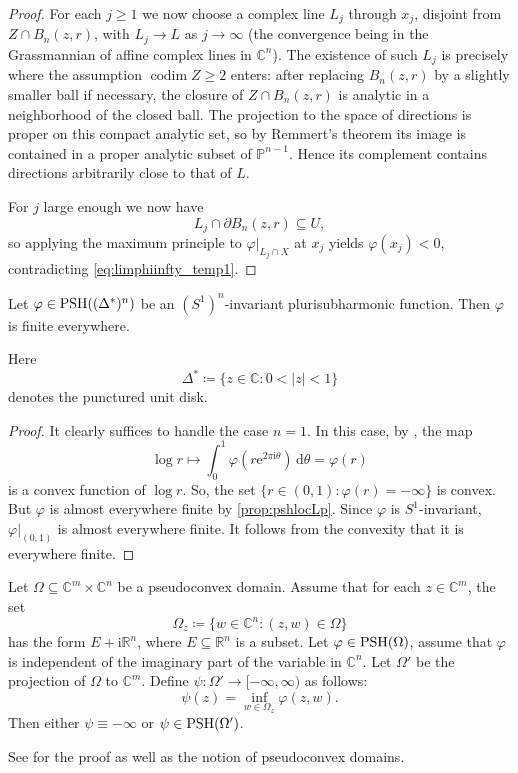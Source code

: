 \begin{proof}
    For each $j\geq 1$ we now choose a complex line $L_j$ through $x_j$, disjoint from $Z\cap B_n(z,r)$, with $L_j\to L$ as $j\to\infty$ (the convergence being in the Grassmannian of affine complex lines in $\mathbb{C}^n$). The existence of such $L_j$ is precisely where the assumption $\operatorname{codim} Z\geq 2$ enters: after replacing $B_n(z,r)$ by a slightly smaller ball if necessary, the closure of $Z\cap B_n(z,r)$ is analytic in a neighborhood of the closed ball. The projection to the space of directions is proper on this compact analytic set, so by Remmert's theorem its image is contained in a proper analytic subset of $\mathbb{P}^{n-1}$. Hence its complement contains directions arbitrarily close to that of $L$.

    For $j$ large enough we now have
    \[
        L_j\cap \partial B_n(z,r)\subseteq U,
    \]
    so applying the maximum principle to $\varphi|_{L_j\cap X}$ at $x_j$ yields $\varphi(x_j)<0$, contradicting \eqref{eq:limphiinfty_temp1}.
\end{proof}



\begin{lemma}\label{lma:invariantpshfunfinite}
    Let $\varphi\in \mathrm{PSH}((\Delta^*)^n)$ be an $(S^1)^n$-invariant plurisubharmonic function. Then $\varphi$ is finite everywhere.
\end{lemma}
Here
\[
\Delta^*\coloneqq \{z\in \mathbb{C}: 0<|z|<1\}
\]
denotes the punctured unit disk.
\begin{proof}
    It clearly suffices to handle the case $n=1$. In this case, by \cite[Theorem~2.12]{HK76}, the map
    \[
    \log r\mapsto \int_{0}^{1} \varphi\left(r\mathrm{e}^{2\pi\mathrm{i}\theta}\right)\,\mathrm{d}\theta=\varphi(r)
    \]
    is a convex function of $\log r$.
    So, the set $\{r\in (0,1): \varphi(r)=-\infty\}$ is convex.
    But $\varphi$ is almost everywhere finite by \cref{prop:pshlocLp}. Since $\varphi$ is $S^1$-invariant, $\varphi|_{(0,1)}$ is almost everywhere finite.
    It follows from the convexity that it is everywhere finite.
\end{proof}




\begin{proposition}\label{prop:Kis}
Let $\Omega\subseteq \mathbb{C}^m\times \mathbb{C}^n$ be a pseudoconvex domain. Assume that for each $z\in \mathbb{C}^m$, the set
\[
    \Omega_z\coloneqq \bigl\{w\in\mathbb{C}^n: (z,w)\in \Omega \bigr\}
\]
has the form $E+\mathrm{i}\mathbb{R}^n$, where $E\subseteq \mathbb{R}^n$ is a subset. Let $\varphi\in \mathrm{PSH}(\Omega)$, assume that $\varphi$ is independent of the imaginary part of the variable in $\mathbb{C}^n$. Let $\Omega'$ be the projection of $\Omega$ to $\mathbb{C}^m$. Define $\psi\colon \Omega'\rightarrow [-\infty,\infty)$ as follows:
\[
    \psi(z)=\inf_{w\in \Omega_z}\varphi(z,w).
\]
Then either $\psi\equiv -\infty$ or $\psi\in \mathrm{PSH}(\Omega')$.
\end{proposition}
See \cite[Theorem~7.5]{DemBook} for the proof as well as the notion of pseudoconvex domains.

